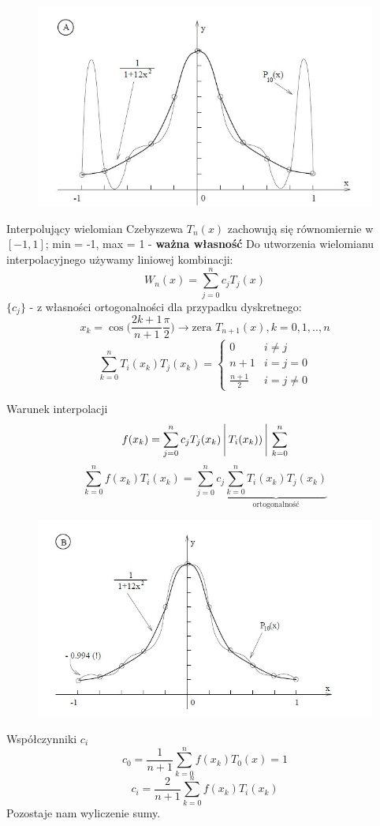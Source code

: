 \begin{frame}
	\begin{figure}
		\includegraphics[height=0.8\textheight]{img/5/czebyszew.jpg}
	\end{figure}
\end{frame}
\begin{frame}{Interpolujący wielomian Czebyszewa}
	$T_n(x)$ zachowują się równomiernie w $[-1,1]$; min = -1, max = 1 - \textbf{ważna własność} \newline
    Do utworzenia wielomianu interpolacyjnego używamy liniowej kombinacji:
    $$W_n(x) = \sum_{j=0}^{n}c_jT_j(x)$$
    $\{c_j\}$ - z własności ortogonalności dla przypadku dyskretnego:
    $$x_k=\cos\Big(\frac{2k+1}{n+1}\frac{\pi}{2}\Big)\rightarrow \text{zera } T_{n+1}(x),k=0,1,..,n$$
    $$\sum_{k=0}^{n}T_i(x_k)T_j(x_k) = \left\{\begin{array}{cc}
    	0 & i \not= j \\
        n+1 & i=j=0 \\
        \frac{n+1}{2} & i=j\not=0
    \end{array}\right.$$
\end{frame}
\begin{frame}{Warunek interpolacji}
	$$f(x_k)= \sum_{j=0}^{n}c_jT_j(x_k)\Bigg\arrowvert T_i(x_k)) \Bigg\arrowvert \sum_{k=0}^{n}$$
    $$\sum_{k=0}^{n}f(x_k)T_i(x_k)=\sum_{j=0}^{n}c_j\underbrace{\sum_{k=0}^{n}T_i(x_k)T_j(x_k)}_{\text{ortogonalność}}$$
\end{frame}
\begin{frame}
	\begin{figure}
		\includegraphics[height=0.8\textheight]{img/5/interpolacja.jpg}
	\end{figure}
\end{frame}
\begin{frame}{Współczynniki $c_i$}
	$$c_0 = \frac{1}{n+1}\sum_{k=0}^{n}f(x_k)T_0(x)=1$$
    $$c_i = \frac{2}{n+1}\sum_{k=0}^{n}f(x_k)T_i(x_k)$$
    Pozostaje nam wyliczenie sumy.
\end{frame}
